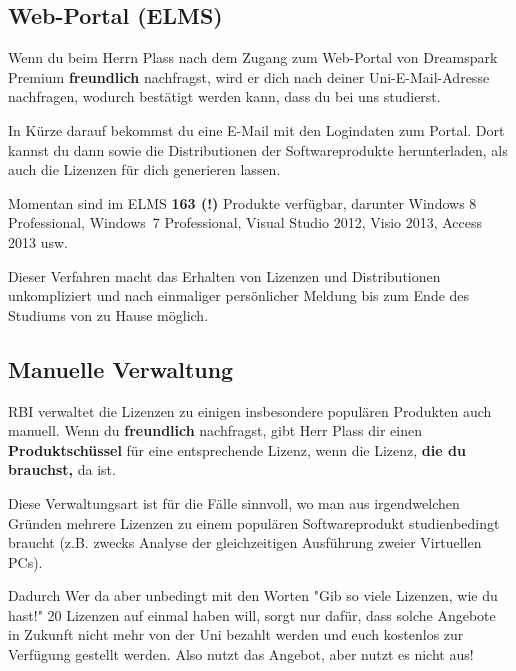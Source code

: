 \subsection{Web-Portal (ELMS)}

Wenn du beim Herrn Plass nach dem Zugang zum Web-Portal von Dreamspark Premium \textbf{freundlich} nachfragst, wird er dich nach deiner Uni-E-Mail-Adresse nachfragen, wodurch bestätigt werden kann, dass du bei uns studierst.

In Kürze darauf bekommst du eine E-Mail mit den Logindaten zum Portal. Dort kannst du dann sowie die Distributionen der Softwareprodukte herunterladen, als auch die Lizenzen für dich generieren lassen.

Momentan sind im ELMS \textbf{163 (!)} Produkte verfügbar, darunter Windows 8 Professional, Windows~7 Professional, Visual Studio 2012, Visio 2013, Access 2013 usw.

Dieser Verfahren macht das Erhalten von Lizenzen und Distributionen unkompliziert und nach einmaliger persönlicher Meldung bis zum Ende des Studiums von zu Hause möglich.

\subsection{Manuelle Verwaltung}

RBI verwaltet die Lizenzen zu einigen insbesondere populären Produkten auch manuell. Wenn du \textbf{freundlich} nachfragst, gibt Herr Plass dir einen \textbf{Produktschüssel} für eine entsprechende Lizenz, wenn die Lizenz, \textbf{die du brauchst,} da ist.

Diese Verwaltungsart ist für die Fälle sinnvoll, wo man aus irgendwelchen Gründen mehrere Lizenzen zu einem populären Softwareprodukt studienbedingt braucht (z.B. zwecks Analyse der gleichzeitigen Ausführung zweier Virtuellen PCs).

Dadurch Wer da aber unbedingt mit den Worten "Gib so viele Lizenzen, wie du hast!" 20 Lizenzen auf einmal haben will, sorgt nur dafür, dass solche Angebote in Zukunft nicht mehr von der Uni bezahlt werden und euch kostenlos zur Verfügung gestellt werden. Also nutzt das Angebot, aber nutzt es nicht aus!

